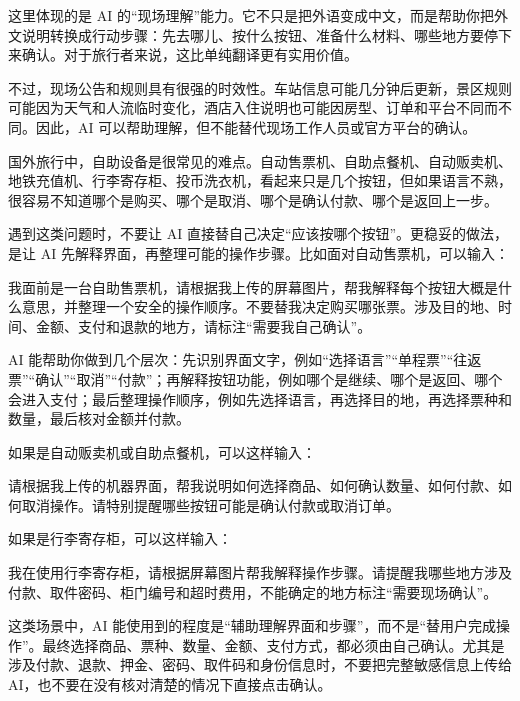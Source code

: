 这里体现的是 AI 的“现场理解”能力。它不只是把外语变成中文，而是帮助你把外文说明转换成行动步骤：先去哪儿、按什么按钮、准备什么材料、哪些地方要停下来确认。对于旅行者来说，这比单纯翻译更有实用价值。

不过，现场公告和规则具有很强的时效性。车站信息可能几分钟后更新，景区规则可能因为天气和人流临时变化，酒店入住说明也可能因房型、订单和平台不同而不同。因此，AI 可以帮助理解，但不能替代现场工作人员或官方平台的确认。


国外旅行中，自助设备是很常见的难点。自动售票机、自助点餐机、自动贩卖机、地铁充值机、行李寄存柜、投币洗衣机，看起来只是几个按钮，但如果语言不熟，很容易不知道哪个是购买、哪个是取消、哪个是确认付款、哪个是返回上一步。

遇到这类问题时，不要让 AI 直接替自己决定“应该按哪个按钮”。更稳妥的做法，是让 AI 先解释界面，再整理可能的操作步骤。比如面对自动售票机，可以输入：

\begin{tcolorbox}[promptbox]
我面前是一台自助售票机，请根据我上传的屏幕图片，帮我解释每个按钮大概是什么意思，并整理一个安全的操作顺序。不要替我决定购买哪张票。涉及目的地、时间、金额、支付和退款的地方，请标注“需要我自己确认”。
\end{tcolorbox}

AI 能帮助你做到几个层次：先识别界面文字，例如“选择语言”“单程票”“往返票”“确认”“取消”“付款”；再解释按钮功能，例如哪个是继续、哪个是返回、哪个会进入支付；最后整理操作顺序，例如先选择语言，再选择目的地，再选择票种和数量，最后核对金额并付款。

如果是自动贩卖机或自助点餐机，可以这样输入：

\begin{tcolorbox}[promptbox]
请根据我上传的机器界面，帮我说明如何选择商品、如何确认数量、如何付款、如何取消操作。请特别提醒哪些按钮可能是确认付款或取消订单。
\end{tcolorbox}

如果是行李寄存柜，可以这样输入：

\begin{tcolorbox}[promptbox]
我在使用行李寄存柜，请根据屏幕图片帮我解释操作步骤。请提醒我哪些地方涉及付款、取件密码、柜门编号和超时费用，不能确定的地方标注“需要现场确认”。
\end{tcolorbox}

这类场景中，AI 能使用到的程度是“辅助理解界面和步骤”，而不是“替用户完成操作”。最终选择商品、票种、数量、金额、支付方式，都必须由自己确认。尤其是涉及付款、退款、押金、密码、取件码和身份信息时，不要把完整敏感信息上传给 AI，也不要在没有核对清楚的情况下直接点击确认。

